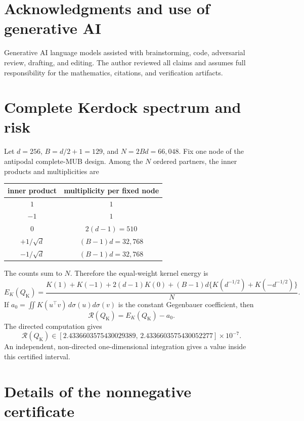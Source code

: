 \documentclass[11pt]{article}
\begin{document}
\section{Acknowledgments and use of generative AI}
\label{acknowledgments-and-use-of-generative-ai}

Generative AI language models assisted with brainstorming, code,
adversarial review, drafting, and editing. The author reviewed all claims
and assumes full responsibility for the mathematics, citations, and
verification artifacts.

\appendix

\section{Complete Kerdock spectrum and risk}\label{app:kerdock}

Let $d=256$, $B=d/2+1=129$, and $N=2Bd=66{,}048$. Fix one node of the
antipodal complete-MUB design. Among the $N$ ordered partners, the inner
products and multiplicities are

\begin{center}
\begin{tabular}{@{}cc@{}}
\toprule
inner product & multiplicity per fixed node \\
\midrule
$1$ & $1$ \\
$-1$ & $1$ \\
$0$ & $2(d-1)=510$ \\
$+1/\sqrt d$ & $(B-1)d=32{,}768$ \\
$-1/\sqrt d$ & $(B-1)d=32{,}768$ \\
\bottomrule
\end{tabular}
\end{center}

The counts sum to $N$. Therefore the equal-weight kernel energy is
\[
E_K(Q_{\mathrm K})=
\frac{K(1)+K(-1)+2(d-1)K(0)
 +(B-1)d\{K(d^{-1/2})+K(-d^{-1/2})\}}{N}.
\]
If $a_0=\iint K(u^\top v)\,d\sigma(u)d\sigma(v)$ is the constant
Gegenbauer coefficient, then
\[
\mathcal R(Q_{\mathrm K})=E_K(Q_{\mathrm K})-a_0.
\]
The directed computation gives
\[
\mathcal R(Q_{\mathrm K})\in
[2.4336603575430029389,\,2.4336603575430052277]\times10^{-7}.
\]
An independent, non-directed one-dimensional integration gives a value
inside this certified interval.

\section{Details of the nonnegative certificate}\label{app:nonnegative}
\end{document}

